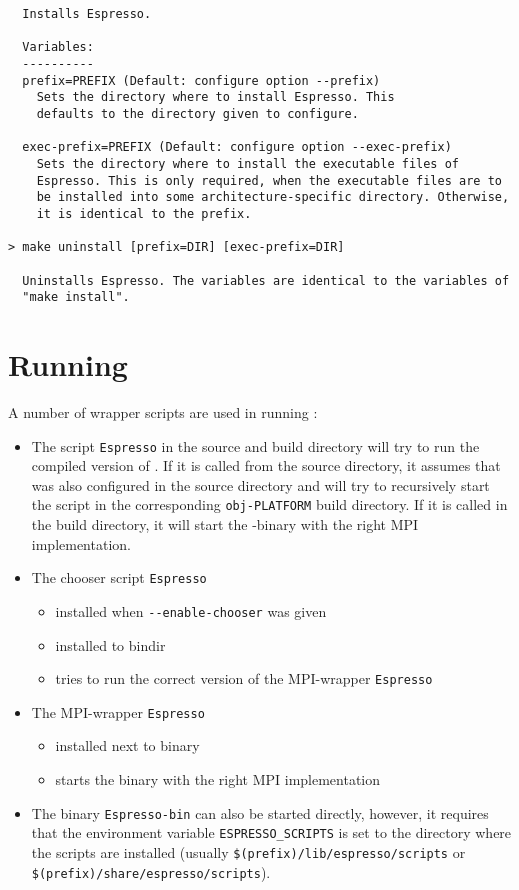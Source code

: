 \begin{verbatim}
  Installs Espresso.

  Variables:
  ----------
  prefix=PREFIX (Default: configure option --prefix)
    Sets the directory where to install Espresso. This
    defaults to the directory given to configure.

  exec-prefix=PREFIX (Default: configure option --exec-prefix)
    Sets the directory where to install the executable files of
    Espresso. This is only required, when the executable files are to
    be installed into some architecture-specific directory. Otherwise,
    it is identical to the prefix.

> make uninstall [prefix=DIR] [exec-prefix=DIR]

  Uninstalls Espresso. The variables are identical to the variables of
  "make install".
\end{verbatim}

\section{Running \es}
\label{sec:run}

A number of wrapper scripts are used in running \es{}:
\begin{itemize}
\item The script \texttt{Espresso} in the source and build directory
  will try to run the compiled version of \es. If it is called from
  the source directory, it assumes that \es{} was also configured in
  the source directory and will try to recursively start the script in
  the corresponding \texttt{obj-PLATFORM} build directory. If it is
  called in the build directory, it will start the \es-binary with the
  right MPI implementation.
\item The chooser script \texttt{Espresso} 
  \begin{itemize}
  \item installed when \verb!--enable-chooser! was given
  \item installed to bindir
  \item tries to run the correct version of the MPI-wrapper
    \texttt{Espresso}
  \end{itemize}
\item The MPI-wrapper \texttt{Espresso}
  \begin{itemize}
  \item installed next to \es{} binary
  \item starts the binary with the right MPI implementation
  \end{itemize}
\item The \es{} binary \texttt{Espresso-bin} can also be started
  directly, however, it requires that the environment variable
  \verb!ESPRESSO_SCRIPTS! is set to the directory where the scripts
  are installed (usually \verb!$(prefix)/lib/espresso/scripts! or
  \verb!$(prefix)/share/espresso/scripts!).
\end{itemize}

